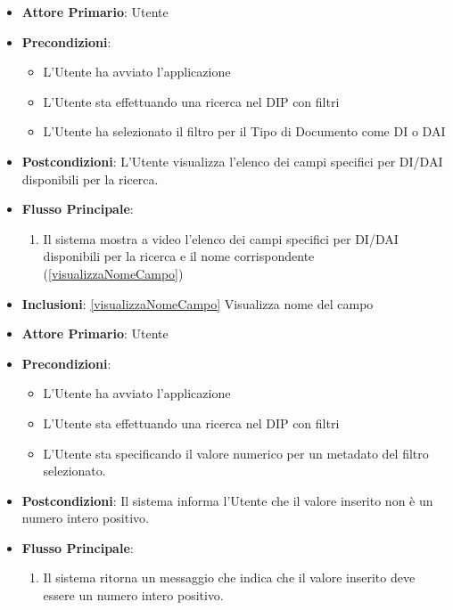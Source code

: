 \begin{itemize}
      \item \textbf{Attore Primario}: Utente
      \item \textbf{Precondizioni}: \begin{itemize}
            \item L'Utente ha avviato l'applicazione
            \item L'Utente sta effettuando una ricerca nel DIP con filtri
            \item L'Utente ha selezionato il filtro per il Tipo di Documento come DI o DAI
      \end{itemize}
      \item \textbf{Postcondizioni}:  L'Utente visualizza l'elenco dei campi specifici per DI/DAI disponibili per la ricerca.
      \item \textbf{Flusso Principale}:
            \begin{enumerate}
                  \item Il sistema mostra a video l'elenco dei campi specifici per DI/DAI disponibili per la ricerca e il nome corrispondente (\ref{visualizzaNomeCampo})
            \end{enumerate}
      \item \textbf{Inclusioni}: \ref{visualizzaNomeCampo} Visualizza nome del campo
\end{itemize}

\begin{itemize}
      \item \textbf{Attore Primario}: Utente
      \item \textbf{Precondizioni}: \begin{itemize}
            \item L'Utente ha avviato l'applicazione
            \item L'Utente sta effettuando una ricerca nel DIP con filtri
            \item L'Utente sta specificando il valore numerico per un metadato del filtro selezionato.
      \end{itemize}
      \item \textbf{Postcondizioni}: Il sistema informa l'Utente che il valore inserito non è un numero intero positivo.
      \item \textbf{Flusso Principale}:
      \begin{enumerate}
            \item Il sistema ritorna un messaggio che indica che il valore inserito deve essere un numero intero positivo.
      \end{enumerate}
\end{itemize}

